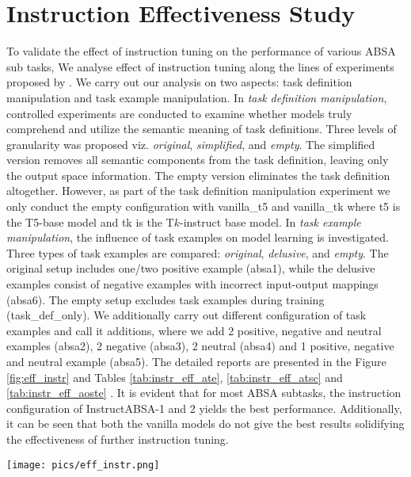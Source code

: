 \documentclass[11pt]{article}
\newcommand{\name}{\textsc{I}nstruct\textsc{ABSA}\xspace}
\begin{document}
\section{Instruction Effectiveness Study}
To validate the effect of instruction tuning on the performance of various ABSA sub tasks, 
We analyse effect of instruction tuning along the lines of experiments proposed by \citet{kung2023models}. 
We carry out our analysis on two aspects: task definition manipulation and task example manipulation. 
In \emph{task definition manipulation}, controlled experiments are conducted to examine whether models truly comprehend and utilize the semantic meaning of task definitions. 
Three levels of granularity was proposed viz. \emph{original}, \emph{simplified}, and \emph{empty}. 
The simplified version removes all semantic components from the task definition, leaving only the output space information. 
The empty version eliminates the task definition altogether. 
However, as part of the task definition manipulation experiment we only conduct the empty configuration with vanilla\_t5 and vanilla\_tk where t5 is the T5-base model and tk is the T$k$-instruct base model. 
In \emph{task example manipulation}, the influence of task examples on model learning is investigated. 
Three types of task examples are compared: \emph{original}, \emph{delusive}, and \emph{empty}. 
The original setup includes one/two positive example (absa1), while the delusive examples consist of negative examples with incorrect input-output mappings (absa6). 
The empty setup excludes task examples during training (task\_def\_only). 
We additionally carry out different configuration of task examples and call it additions, where we add 2 positive, negative and neutral examples (absa2), 2 negative (absa3), 2 neutral (absa4) and 1 positive, negative and neutral example (absa5). 
The detailed reports are presented in the Figure \ref{fig:eff_instr} and Tables \ref{tab:instr_eff_ate}, \ref{tab:instr_eff_atsc} and \ref{tab:instr_eff_aoste} . 
It is evident that for most ABSA subtasks, the instruction configuration of \name{}-1 and 2 yields the best performance. 
Additionally, it can be seen that both the vanilla models do not give the best results solidifying the effectiveness of further instruction tuning. 

\begin{figure*}[ht!]
	\centering
	\texttt{[image: pics/eff\_instr.png]}
	\caption{Comparison of various instruction configuration and its performance on ATE, AOSTE and ATSC subtasks. 
 Vanilla\_t5 and Vanilla\_tk represent the models trained without any instruction. 
 absa1, absa2, absa3, absa4, absa5 are different instruction configurations that include a definition followed by 2 positive, 2 positive, negative and neutral examples, 2 negative examples, 2 neutral examples, 1 positive, negative and neutral examples and finally examples with incorrect input and output mappings respectively. task\_def\_only only contains the task definitions.}
	\label{fig:eff_instr}
\end{figure*} 
\end{document}
